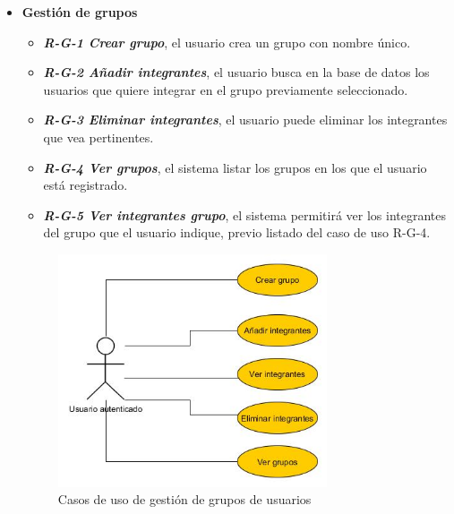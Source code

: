 \begin{itemize}
\item \textbf{Gestión de grupos}
\begin{itemize}
\item\textbf{ \textit{R-G-1 Crear grupo}}, el usuario crea un grupo con nombre único.
\item\textbf{\textit{ R-G-2 Añadir integrantes}}, el usuario busca en la base de datos los usuarios que quiere integrar en el grupo previamente seleccionado.
\item \textbf{\textit{R-G-3 Eliminar integrantes}}, el usuario puede eliminar los integrantes que vea pertinentes.
\item \textbf{\textit{R-G-4 Ver grupos}}, el sistema listar los grupos en los que el usuario está registrado.
\item \textbf{\textit{R-G-5 Ver integrantes grupo}}, el sistema permitirá ver los integrantes del grupo que el usuario indique, previo listado del caso de uso R-G-4. 

\end{itemize} 

\begin{figure}[H]
		\centering
		\includegraphics[width=0.75\textwidth] {grupo.jpg}
		\caption{Casos de uso de gestión de grupos de usuarios }
	\end{figure}
	
	
	

\end{itemize}
